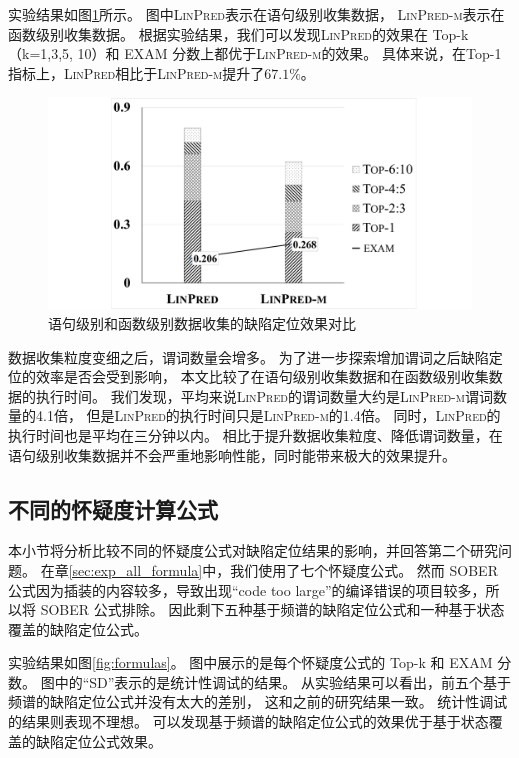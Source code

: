 实验结果如图\ref{fig:ms-level-compare}所示。
图中\textsc{LinPred}表示在语句级别收集数据，
\textsc{LinPred-m}表示在函数级别收集数据。
根据实验结果，我们可以发现\textsc{LinPred}的效果在
Top-k（k=1,3,5, 10）和 EXAM 分数上都优于\textsc{LinPred-m}的效果。
具体来说，在Top-1指标上，\textsc{LinPred}相比于\textsc{LinPred-m}提升了$67.1\%$。


\begin{figure}[htbp] 
\centering 
\includegraphics[width=12cm]{figure/ms-level-compare} 
\caption{语句级别和函数级别数据收集的缺陷定位效果对比} 
\label{fig:ms-level-compare}
\end{figure}

数据收集粒度变细之后，谓词数量会增多。
为了进一步探索增加谓词之后缺陷定位的效率是否会受到影响，
本文比较了在语句级别收集数据和在函数级别收集数据的执行时间。
我们发现，平均来说\textsc{LinPred}的谓词数量大约是\textsc{LinPred-m}谓词数量的4.1倍，
但是\textsc{LinPred}的执行时间只是\textsc{LinPred-m}的1.4倍。
同时，\textsc{LinPred}的执行时间也是平均在三分钟以内。
相比于提升数据收集粒度、降低谓词数量，在语句级别收集数据并不会严重地影响性能，同时能带来极大的效果提升。

\subsection{不同的怀疑度计算公式}

本小节将分析比较不同的怀疑度公式对缺陷定位结果的影响，并回答第二个研究问题。
在章\ref{sec:exp_all_formula}中，我们使用了七个怀疑度公式。
然而 SOBER 公式因为插装的内容较多，导致出现“code too large”的编译错误的项目较多，所以将 SOBER 公式排除。
因此剩下五种基于频谱的缺陷定位公式和一种基于状态覆盖的缺陷定位公式。

实验结果如图\ref{fig:formulas}。
图中展示的是每个怀疑度公式的 Top-k 和 EXAM 分数。
图中的“SD”表示的是统计性调试的结果。
从实验结果可以看出，前五个基于频谱的缺陷定位公式并没有太大的差别，
这和之前的研究结果一致。
统计性调试的结果则表现不理想。
可以发现基于频谱的缺陷定位公式的效果优于基于状态覆盖的缺陷定位公式效果。

